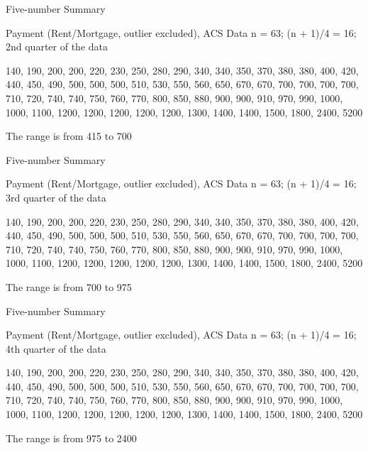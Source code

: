 \documentclass[14pt]{beamer}\usepackage[]{graphicx}\usepackage[]{color}
\begin{document}
\begin{frame}[fragile]{Five-number Summary}

Payment (Rent/Mortgage, outlier excluded), ACS Data
n = 63;	(n + 1)/4 = 16;	2nd quarter of the data 

\vspace{3mm}

140, 190, 200, 200, 220, 230, 250, 280, 290, 340, 340, 350, 370, 380, 380, 400, 420, 440, 450, 490, 500, 500, 500, 510, 530, 550, 560, 650, 670, 670, 700, 700, 700, 700, 710, 720, 740, 740, 750, 760, 770, 800, 850, 880, 900, 900, 910, 970, 990, 1000, 1000, 1100, 1200, 1200, 1200, 1200, 1200, 1300, 1400, 1400, 1500, 1800, 2400, 5200

\vspace{3mm}

The range is from 415 to 700
\end{frame}

\begin{frame}[fragile]{Five-number Summary}

Payment (Rent/Mortgage, outlier excluded), ACS Data
n = 63;	(n + 1)/4 = 16;	3rd quarter of the data 

\vspace{3mm}

140, 190, 200, 200, 220, 230, 250, 280, 290, 340, 340, 350, 370, 380, 380, 400, 420, 440, 450, 490, 500, 500, 500, 510, 530, 550, 560, 650, 670, 670, 700, 700, 700, 700, 710, 720, 740, 740, 750, 760, 770, 800, 850, 880, 900, 900, 910, 970, 990, 1000, 1000, 1100, 1200, 1200, 1200, 1200, 1200, 1300, 1400, 1400, 1500, 1800, 2400, 5200

\vspace{3mm}

The range is from 700 to 975
\end{frame}

\begin{frame}[fragile]{Five-number Summary}

Payment (Rent/Mortgage, outlier excluded), ACS Data
n = 63;	(n + 1)/4 = 16;	4th quarter of the data 

\vspace{3mm}

140, 190, 200, 200, 220, 230, 250, 280, 290, 340, 340, 350, 370, 380, 380, 400, 420, 440, 450, 490, 500, 500, 500, 510, 530, 550, 560, 650, 670, 670, 700, 700, 700, 700, 710, 720, 740, 740, 750, 760, 770, 800, 850, 880, 900, 900, 910, 970, 990, 1000, 1000, 1100, 1200, 1200, 1200, 1200, 1200, 1300, 1400, 1400, 1500, 1800, 2400, 5200

\vspace{3mm}

The range is from 975 to 2400
\end{frame}
\end{document}
